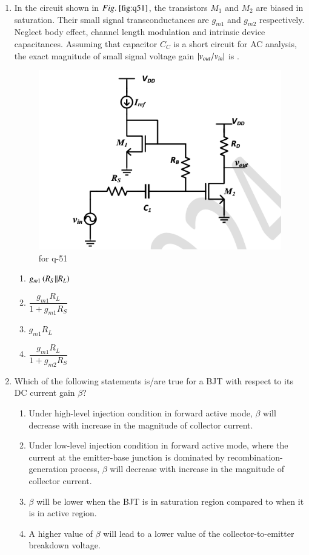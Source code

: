\documentclass[journal,12pt,onecolumn]{IEEEtran}
\theoremstyle{remark}
\begin{document}
\begin{enumerate}
\item In the circuit shown in $\figref{fig:q51}$, the transistors $M_1$ and $M_2$ are biased in saturation. Their small signal transconductances are $g_{m1}$ and $g_{m2}$ respectively. Neglect body effect, channel length modulation and intrinsic device capacitances. Assuming that capacitor $C_C$ is a short circuit for AC analysis, the exact magnitude of small signal voltage gain $\left\vert v_{out}/v_{in}\right\vert$ is \underline{\hspace{2cm}}.
\begin{figure}[H]
    \centering
    \includegraphics[width=0.3\columnwidth]{q51.png}
    \caption{for q-51}
    \label{fig:q51}
\end{figure}
\hfill{}
\begin{multicols}{4}
    \begin{enumerate}
    \item $g_{m1}\left(R_S || R_L\right)$
    \item $\dfrac{g_{m1} R_L}{1 + g_{m1} R_S}$
    \item $g_{m1} R_L$
    \item $\dfrac{g_{m1} R_L}{1 + g_{m2} R_S}$
\end{enumerate}
\end{multicols}


\item Which of the following statements is/are true for a BJT with respect to its DC current gain $\beta$?

\hfill{}
\begin{enumerate}
    \item Under high-level injection condition in forward active mode, $\beta$ will decrease with increase in the magnitude of collector current.
    \item Under low-level injection condition in forward active mode, where the current at the emitter-base junction is dominated by recombination-generation process, $\beta$ will decrease with increase in the magnitude of collector current.
    \item $\beta$ will be lower when the BJT is in saturation region compared to when it is in active region.
    \item A higher value of $\beta$ will lead to a lower value of the collector-to-emitter breakdown voltage.
\end{enumerate}


\end{enumerate}
\end{document}
